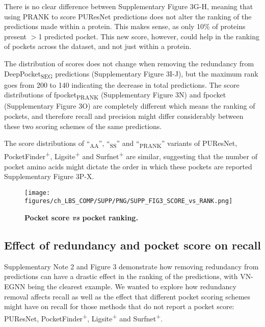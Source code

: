 There is no clear difference between Supplementary Figure 3G-H, meaning that using PRANK to score PUResNet predictions does not alter the ranking of the predictions made within a protein. This makes sense, as only 10\% of proteins present $>$1 predicted pocket. This new score, however, could help in the ranking of pockets across the dataset, and not just within a protein.

The distribution of scores does not change when removing the redundancy from DeepPocket\textsubscript{SEG} predictions (Supplementary Figure 3I-J), but the maximum rank goes from 200 to 140 indicating the decrease in total predictions. The score distributions of fpocket\textsubscript{PRANK} (Supplementary Figure 3N) and fpocket (Supplementary Figure 3O) are completely different which means the ranking of pockets, and therefore recall and precision might differ considerably between these two scoring schemes of the same predictions.

The score distributions of ``\textsubscript{AA}'', ``\textsubscript{SS}'' and ``\textsubscript{PRANK}'' variants of PUResNet, PocketFinder\textsuperscript{+}, Ligsite\textsuperscript{+} and Surfnet\textsuperscript{+} are similar, suggesting that the number of pocket amino acids might dictate the order in which these pockets are reported Supplementary Figure 3P-X.

\begin{figure}[ht!]
    \centering
    \texttt{[image: figures/ch\_LBS\_COMP/SUPP/PNG/SUPP\_FIG3\_SCORE\_vs\_RANK.png]}
    \caption[Pocket score \textit{vs} pocket ranking]{\textbf{Pocket score \textit{vs} pocket ranking.}}
    \label{fig:pocket_score_vs_rank}
\end{figure}

\subsection{Effect of redundancy and pocket score on recall}

Supplementary Note 2 and Figure 3 demonstrate how removing redundancy from predictions can have a drastic effect in the ranking of the predictions, with VN-EGNN being the clearest example. We wanted to explore how redundancy removal affects recall as well as the effect that different pocket scoring schemes might have on recall for those methods that do not report a pocket score: PUResNet, PocketFinder\textsuperscript{+}, Ligsite\textsuperscript{+} and Surfnet\textsuperscript{+}.

